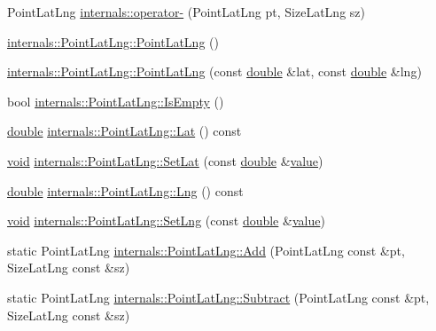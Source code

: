\begin{DoxyCompactItemize}
\item 
Point\-Lat\-Lng \hyperlink{group___o_p_map_widget_ga6bd5d678b59611b56100b7558d386ba0}{internals\-::operator-\/} (Point\-Lat\-Lng pt, Size\-Lat\-Lng sz)
\item 
\hyperlink{group___o_p_map_widget_ga1e0b690c0014f60cf7b9444345110709}{internals\-::\-Point\-Lat\-Lng\-::\-Point\-Lat\-Lng} ()
\item 
\hyperlink{group___o_p_map_widget_ga9d9ccecdc15490db949e762a8d5bfd25}{internals\-::\-Point\-Lat\-Lng\-::\-Point\-Lat\-Lng} (const \hyperlink{_super_l_u_support_8h_a8956b2b9f49bf918deed98379d159ca7}{double} \&lat, const \hyperlink{_super_l_u_support_8h_a8956b2b9f49bf918deed98379d159ca7}{double} \&lng)
\item 
bool \hyperlink{group___o_p_map_widget_gadcc729a47d0615eb914a429e90acc041}{internals\-::\-Point\-Lat\-Lng\-::\-Is\-Empty} ()
\item 
\hyperlink{_super_l_u_support_8h_a8956b2b9f49bf918deed98379d159ca7}{double} \hyperlink{group___o_p_map_widget_gacf58e663626e5a88876d68937505dc64}{internals\-::\-Point\-Lat\-Lng\-::\-Lat} () const 
\item 
\hyperlink{group___u_a_v_objects_plugin_ga444cf2ff3f0ecbe028adce838d373f5c}{void} \hyperlink{group___o_p_map_widget_ga800a9e0154cc69ea20a677726a3a82c9}{internals\-::\-Point\-Lat\-Lng\-::\-Set\-Lat} (const \hyperlink{_super_l_u_support_8h_a8956b2b9f49bf918deed98379d159ca7}{double} \&\hyperlink{glext_8h_aa0e2e9cea7f208d28acda0480144beb0}{value})
\item 
\hyperlink{_super_l_u_support_8h_a8956b2b9f49bf918deed98379d159ca7}{double} \hyperlink{group___o_p_map_widget_ga2a02db7101a66a3c2e5f536e60b38423}{internals\-::\-Point\-Lat\-Lng\-::\-Lng} () const 
\item 
\hyperlink{group___u_a_v_objects_plugin_ga444cf2ff3f0ecbe028adce838d373f5c}{void} \hyperlink{group___o_p_map_widget_gaa211add3899eb9c7ca5f82fad953461c}{internals\-::\-Point\-Lat\-Lng\-::\-Set\-Lng} (const \hyperlink{_super_l_u_support_8h_a8956b2b9f49bf918deed98379d159ca7}{double} \&\hyperlink{glext_8h_aa0e2e9cea7f208d28acda0480144beb0}{value})
\item 
static Point\-Lat\-Lng \hyperlink{group___o_p_map_widget_ga52f0413f61d22a37409a17892acf80cd}{internals\-::\-Point\-Lat\-Lng\-::\-Add} (Point\-Lat\-Lng const \&pt, Size\-Lat\-Lng const \&sz)
\item 
static Point\-Lat\-Lng \hyperlink{group___o_p_map_widget_ga1666139610f408d4ec78b5afafdff3d9}{internals\-::\-Point\-Lat\-Lng\-::\-Subtract} (Point\-Lat\-Lng const \&pt, Size\-Lat\-Lng const \&sz)

\end{DoxyCompactItemize}
